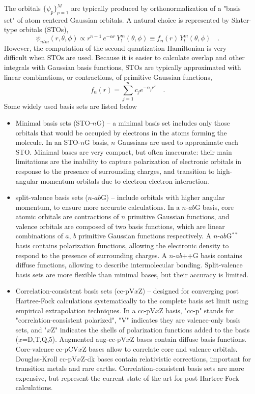 \documentclass{article}
\begin{document}
The orbitals $\{\psi_p\}_{p=1}^M$ are typically produced by orthonormalization of a "basis set" of atom centered Gaussian orbitals.
A natural choice is represented by Slater-type orbitals (STOs),
\begin{equation}
\psi_{nlm}(r,\theta,\phi) \propto r^{n-1} \, e^{- \alpha r} \, Y^m_l(\theta,\phi) \equiv f_n(r) \, Y^m_l(\theta,\phi)
\quad.
\end{equation}
However, the computation of the second-quantization Hamiltonian is very difficult when STOs are used.
Because it is easier to calculate overlap and other integrals with Gaussian basis functions, STOs are typically
approximated with linear combinations, or contractions, of primitive Gaussian functions,
\begin{equation}
f_n(r) = \sum_{j=1}^n c_j e^{- \alpha_j r^2}
\quad.
\end{equation}
Some widely used basis sets are listed below
\begin{itemize}
\item Minimal basis sets (STO-$n$G) -- a minimal basis set includes only those orbitals that would be occupied by electrons in the atoms forming the molecule. In an STO-$n$G basis, $n$ Gaussians are used to approximate
each STO. Minimal bases are very compact, but often inaccurate: their main limitations are the inability to capture polarization of electronic orbitals in response to the presence of surrounding charges, 
and transition to high-angular momentum orbitals due to electron-electron interaction.
\item split-valence basis sets ($n$-$ab$G) -- include orbitals with higher angular momentum, to ensure more accurate calculations. In a $n$-$ab$G basis, core atomic orbitals are contractions of $n$ primitive Gaussian functions,
and valence orbitals are  composed of two basis functions, which are linear combinations of $a$, $b$ primitive Gaussian functions respectively. A $n$-$ab$G$^{**}$ basis contains polarization functions, allowing
the electronic density to respond to the presence of surrounding charges. A $n$-$ab$++G basis contains diffuse functions, allowing to describe intermolecular bonding.
Split-valence basis sets are more flexible than minimal bases, but their accuracy is limited.
\item Correlation-consistent basis sets (cc-pV$x$Z) -- designed for converging post Hartree-Fock calculations systematically to the complete basis set limit using empirical extrapolation techniques.
In a cc-pV$x$Z basis, "cc-p" stands for "correlation-consistent polarized", "V" indicates they are valence-only basis sets, and "$x$Z" indicates the shells of polarization functions added to the basis ($x$=D,T,Q,5).
Augmented aug-cc-pV$x$Z bases contain diffuse basis functions. Core-valence cc-pCV$x$Z bases allow to correlate core and valence orbitals. Douglas-Kroll cc-pV$x$Z-dk bases contain relativistic corrections,
important for transition metals and rare earths.
Correlation-consistent basis sets are more expensive, but represent the current state of the art for post Hartree-Fock calculations.
\end{itemize}
\end{document}
